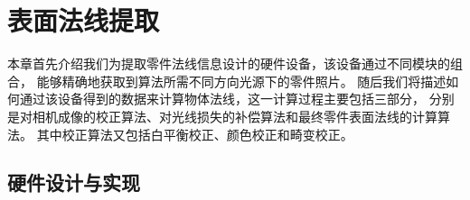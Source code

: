 
\chapter{表面法线提取}

本章首先介绍我们为提取零件法线信息设计的硬件设备，该设备通过不同模块的组合，
能够精确地获取到算法所需不同方向光源下的零件照片。
随后我们将描述如何通过该设备得到的数据来计算物体法线，这一计算过程主要包括三部分，
分别是对相机成像的校正算法、对光线损失的补偿算法和最终零件表面法线的计算算法。
其中校正算法又包括白平衡校正、颜色校正和畸变校正。

\section{硬件设计与实现}
\label{section:yingjianshebeidesheji}

